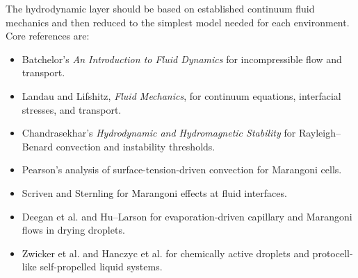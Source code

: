 \documentclass[11pt]{article}
\begin{document}
The hydrodynamic layer should be based on established continuum fluid
mechanics and then reduced to the simplest model needed for each environment.
Core references are:
\begin{itemize}
  \item Batchelor's \emph{An Introduction to Fluid Dynamics} for incompressible
  flow and transport.
  \item Landau and Lifshitz, \emph{Fluid Mechanics}, for continuum equations,
  interfacial stresses, and transport.
  \item Chandrasekhar's \emph{Hydrodynamic and Hydromagnetic Stability} for
  Rayleigh--Benard convection and instability thresholds.
  \item Pearson's analysis of surface-tension-driven convection for Marangoni
  cells.
  \item Scriven and Sternling for Marangoni effects at fluid interfaces.
  \item Deegan et al. and Hu--Larson for evaporation-driven capillary and
  Marangoni flows in drying droplets.
  \item Zwicker et al. and Hanczyc et al. for chemically active droplets and
  protocell-like self-propelled liquid systems.
\end{itemize}
\end{document}
